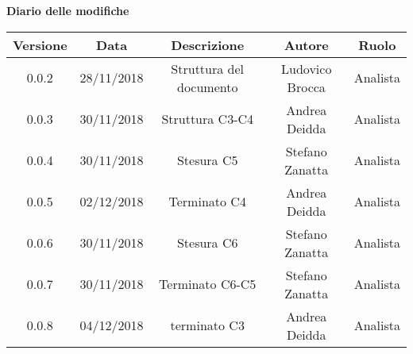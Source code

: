 \begin{center}
		\textbf{Diario delle modifiche}
	\end{center}
	\begin{center}
		\begin{tabular}{|c|c|c|c|c|}
			\hline
			\textbf{Versione} & \textbf{Data} & \textbf{Descrizione} & \textbf{Autore} & \textbf{Ruolo} \\
			\hline 
			0.0.2 & 28/11/2018 & Struttura del documento & Ludovico Brocca & Analista\\
			\hline
			0.0.3 & 30/11/2018 & Struttura C3-C4 & Andrea Deidda & Analista \\
			\hline
			0.0.4 & 30/11/2018 & Stesura C5 & Stefano Zanatta & Analista \\
			\hline
			0.0.5 & 02/12/2018 & Terminato C4 & Andrea Deidda & Analista \\
			\hline
			0.0.6 & 30/11/2018 & Stesura C6 & Stefano Zanatta & Analista \\
			\hline
			0.0.7 & 30/11/2018 & Terminato C6-C5 & Stefano Zanatta & Analista \\
			\hline
			0.0.8 & 04/12/2018 & terminato C3 & Andrea Deidda & Analista \\
			\hline
		\end{tabular}
	\end{center}
\newpage
